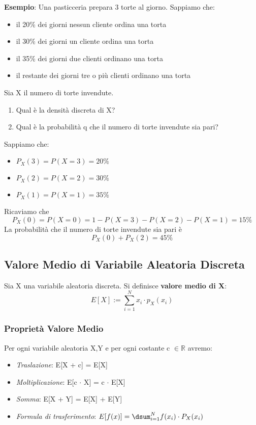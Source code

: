 \begin{tcolorbox} 
    \textbf{Esempio}: Una pasticceria prepara 3 torte al giorno. Sappiamo che:
    \begin{itemize}
        \item il 20\% dei giorni nessun cliente ordina una torta
        \item il 30\% dei giorni un cliente ordina una torta
        \item il 35\% dei giorni due clienti ordinano una torta
        \item il restante dei giorni tre o più clienti ordinano una torta
    \end{itemize}
    Sia X il numero di torte invendute.
    \begin{enumerate}
        \item Qual è la densità discreta di X?        \item Qual è la probabilità q che il numero di torte invendute sia pari?
    \end{enumerate}
    Sappiamo che:
    \begin{itemize}
        \item $P_X(3) = P(X = 3) = 20\%$
        \item $P_X(2) = P(X = 2) = 30\%$
        \item $P_X(1) = P(X = 1) = 35\%$
    \end{itemize}
    Ricaviamo che $$P_X(0) = P(X = 0) = 1 - P(X = 3) - P(X = 2) - P(X = 1) = 15\%$$
    La probabilità che il numero di torte invendute sia pari è $$P_X(0) + P_X(2) = 45\%$$
\end{tcolorbox}

\newpage
\subsection{Valore Medio di Variabile Aleatoria Discreta}

Sia X una variabile aleatoria discreta. Si definisce \textbf{valore medio di X}: $$E[X] := \sum_{i=1}^N x_i \cdot p_X(x_i)$$

\subsubsection{Proprietà Valore Medio}

Per ogni variabile aleatoria X,Y e per ogni costante c $\in \mathbb{R}$ avremo:
\begin{itemize}
    \item \textit{Traslazione}: E[X + c] = E[X] 
    \item \textit{Moltiplicazione}: E[c $\cdot$ X] = c $\cdot$ E[X] 
    \item \textit{Somma}: E[X + Y] = E[X] + E[Y]
    \item \textit{Formula di trasferimento}: $E[f(x)] = \dsum_{i = 1}^N f(x_i) \cdot P_X(x_i)$
\end{itemize}

